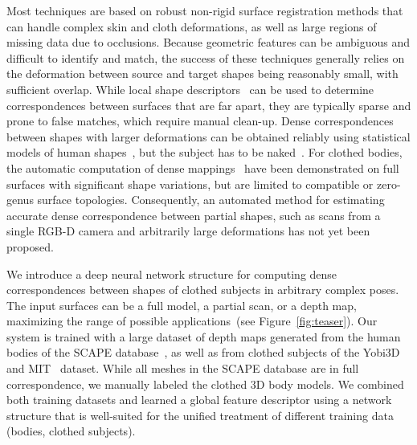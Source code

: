 \documentclass[10pt,twocolumn,letterpaper]{article}
\begin{document}
Most techniques are based on robust non-rigid surface registration methods that can handle complex skin and cloth deformations, as well as large regions of missing data due to occlusions. Because geometric features can be ambiguous and difficult to identify and match, the success of these techniques generally relies on the deformation between source and target shapes being reasonably small, with sufficient overlap. While local shape descriptors~\cite{rusinkiewicz05scan} can be used to determine correspondences between surfaces that are far apart, they are typically sparse and prone to false matches, which require manual clean-up. Dense correspondences between shapes with larger deformations can be obtained reliably using statistical models of human shapes~\cite{Anguelov:2005,Bogo:CVPR:2014}, but the subject has to be naked~\cite{Bogo:ICCV:2015}. For clothed bodies, the automatic computation of dense mappings~\cite{Kim11,Lipman:2009:MVS,Rodola_2014_CVPR,chen15} have been demonstrated on full surfaces with significant shape variations, but are limited to compatible or zero-genus surface topologies. Consequently, an automated method for estimating accurate dense correspondence between partial shapes, such as scans from a single RGB-D camera and arbitrarily large deformations has not yet been proposed.

We introduce a deep neural network structure for computing dense correspondences between shapes of clothed subjects in arbitrary complex poses. The input surfaces can be a full model, a partial scan, or a depth map, maximizing the range of possible applications~(see Figure~\ref{fig:teaser}). Our system is trained with a large dataset of depth maps generated from the human bodies of the SCAPE database~\cite{Anguelov:2005},  as well as from clothed subjects of the Yobi3D~\cite{Yobi3D} and MIT~\cite{Vlasic:2008:AMA} dataset. While all meshes in the SCAPE database are in full correspondence, we manually labeled the clothed 3D body models. We combined both training datasets and learned a global feature descriptor %
using a network structure that is well-suited for the unified treatment of different training data (bodies, clothed subjects).
\end{document}

